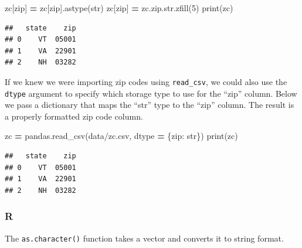 \documentclass[
]{book}
\newenvironment{Shaded}{\begin{snugshade}}{\end{snugshade}}
\newcommand{\BuiltInTok}[1]{#1}
\newcommand{\DecValTok}[1]{\textcolor[rgb]{0.00,0.00,0.81}{#1}}
\newcommand{\FunctionTok}[1]{\textcolor[rgb]{0.00,0.00,0.00}{#1}}
\newcommand{\NormalTok}[1]{#1}
\newcommand{\OperatorTok}[1]{\textcolor[rgb]{0.81,0.36,0.00}{\textbf{#1}}}
\newcommand{\SpecialCharTok}[1]{\textcolor[rgb]{0.00,0.00,0.00}{#1}}
\newcommand{\StringTok}[1]{\textcolor[rgb]{0.31,0.60,0.02}{#1}}
\begin{document}
\begin{Shaded}
\begin{Highlighting}[]
\NormalTok{zc[}\StringTok{\textquotesingle{}zip\textquotesingle{}}\NormalTok{] }\OperatorTok{=}\NormalTok{ zc[}\StringTok{\textquotesingle{}zip\textquotesingle{}}\NormalTok{].astype(}\BuiltInTok{str}\NormalTok{)}
\NormalTok{zc[}\StringTok{\textquotesingle{}zip\textquotesingle{}}\NormalTok{] }\OperatorTok{=}\NormalTok{ zc.}\BuiltInTok{zip}\NormalTok{.}\BuiltInTok{str}\NormalTok{.zfill(}\DecValTok{5}\NormalTok{)}
\BuiltInTok{print}\NormalTok{(zc)}
\end{Highlighting}
\end{Shaded}

\begin{verbatim}
##   state    zip
## 0    VT  05001
## 1    VA  22901
## 2    NH  03282
\end{verbatim}

If we knew we were importing zip codes using \texttt{read\_csv}, we could also use the \texttt{dtype} argument to specify which storage type to use for the ``zip'' column. Below we pass a dictionary that maps the ``str'' type to the ``zip'' column. The result is a properly formatted zip code column.

\begin{Shaded}
\begin{Highlighting}[]
\NormalTok{zc }\OperatorTok{=}\NormalTok{ pandas.read\_csv(}\StringTok{\textquotesingle{}data/zc.csv\textquotesingle{}}\NormalTok{, dtype }\OperatorTok{=}\NormalTok{ \{}\StringTok{\textquotesingle{}zip\textquotesingle{}}\NormalTok{: }\StringTok{\textquotesingle{}str\textquotesingle{}}\NormalTok{\})}
\BuiltInTok{print}\NormalTok{(zc)}
\end{Highlighting}
\end{Shaded}

\begin{verbatim}
##   state    zip
## 0    VT  05001
## 1    VA  22901
## 2    NH  03282
\end{verbatim}

\hypertarget{r-22}{%
\subsubsection*{R}\label{r-22}}

The \texttt{as.character()} function takes a vector and converts it to string format.

\begin{Shaded}
\end{Shaded}
\end{document}
